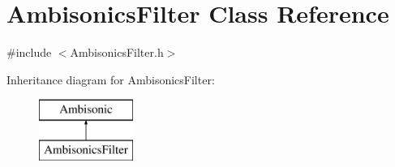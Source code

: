\hypertarget{class_ambisonics_filter}{\section{Ambisonics\-Filter Class Reference}
\label{class_ambisonics_filter}
}


{\ttfamily \#include $<$Ambisonics\-Filter.\-h$>$}

Inheritance diagram for Ambisonics\-Filter\-:\begin{figure}[H]
\begin{center}
\leavevmode
\includegraphics[height=2.000000cm]{class_ambisonics_filter}
\end{center}
\end{figure}
